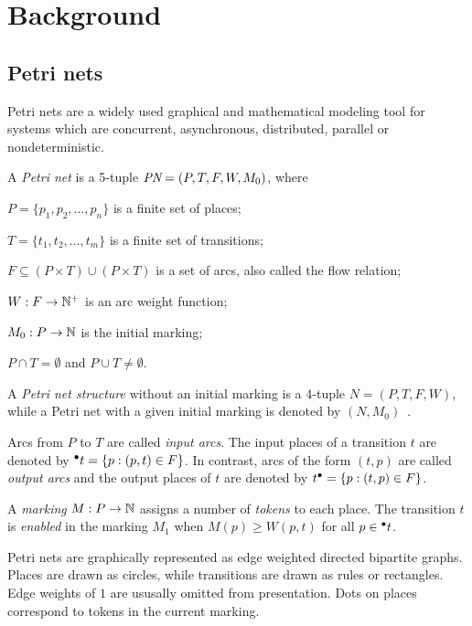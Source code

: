 \chapter{Background}
\label{chap:background}

\section{Petri nets}

Petri nets are a widely used graphical and mathematical modeling tool
for systems which are concurrent, asynchronous, distributed, parallel
or nondeterministic.

\begin{dfn}
  A \emph{Petri net} is a 5-tuple $\textit{PN} = (P, T, F, W, M_0)$, where
  \begin{asparaitem}
  \item $P = \{p_1, p_2, \ldots, p_n\}$ is a finite set of places;
  \item $T = \{t_1, t_2, \ldots, t_m\}$ is a finite set of transitions;
  \item $F \subseteq (P \times T) \cup (P \times T)$ is a set of
    arcs, also called the flow relation;
  \item $W: F \to \mathbb{N}^{+}$ is an arc weight function;
  \item $M_0: P \to \mathbb{N}$ is the initial marking;
  \item $P \cap T = \emptyset$ and $P \cup T \neq \emptyset$.
  \end{asparaitem}
  A \emph{Petri net structure} without an initial marking is a 4-tuple
  $N = (P, T, F, W)$, while a Petri net with a given initial marking
  is denoted by $(N, M_0)$~\citep{murata1989petri}.
\end{dfn}

Arcs from $P$ to $T$ are called \emph{input arcs}. The input places of
a transition $t$ are denoted by $\prescript{\bullet}{}{t} = \{ p : (p, t) \in F
\}$.
In contrast, arcs of the form $(t, p)$ are called \emph{output arcs}
and the output places of $t$ are denoted by
$t^\bullet = \{p : (t, p) \in F \}$.

A \emph{marking} $M: P \to \mathbb{N}$ assigns a number of \emph{tokens} to each
place. The transition $t$ is \emph{enabled} in the marking $M_1$
 when $M(p) \ge W(p, t)$ for all $p \in
\prescript{\bullet}{}{t}$.

Petri nets are graphically represented as edge weighted directed
bipartite graphs. Places are drawn as circles, while transitions are
drawn as rules or rectangles. Edge weights of $1$ are ususally omitted
from presentation. Dots on places correspond to tokens in the current
marking.

